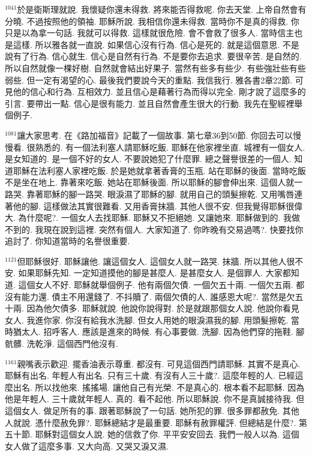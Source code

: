 \documentclass{book}
\begin{document}
$^{1041}$於是衛斯理就說.
我懷疑你還未得救.
將來能否得救呢.
你去天堂.
上帝自然會有分曉.
不過按照他的領袖.
耶穌所說.
我相信你還未得救.
當時你不是真的得救.
你只是以為拿一句話.
我就可以得救.
這樣就很危險.
會不會救了很多人.
當時信主也是這樣.
所以雅各就一直說.
如果信心沒有行為.
信心是死的.
就是這個意思.
不是說有了行為.
信心就生.
信心是自然有行為.
不是要你去追求.
要很辛苦.
是自然的.
所以自然就像一棵好樹.
自然就會結出好果子.
當然有些多有些少.
有些強壯些有些弱些.
但一定有渴望的心.
最後我們要說今天的重點.
我信我行.
雅各書2章22節.
可見他的信心和行為.
互相效力.
並且信心是藉著行為而得以完全.
剛才說了這麼多的引言.
要帶出一點.
信心是很有能力.
並且自然會產生很大的行動.
我先在聖經裡舉個例子.

$^{1081}$讓大家思考.
在《路加福音》記載了一個故事.
第七章36到50節.
你回去可以慢慢看.
很熟悉的.
有一個法利塞人請耶穌吃飯.
耶穌在他家裡坐直.
城裡有一個女人.
是女知道的.
是一個不好的女人.
不要說她犯了什麼罪.
總之聲譽很差的一個人.
知道耶穌在法利塞人家裡吃飯.
於是她就拿著香膏的玉瓶.
站在耶穌的後面.
當時吃飯不是坐在地上.
靠著來吃飯.
她站在耶穌後面.
所以耶穌的腳會伸出來.
這個人就一路哭.
靠著耶穌的腳一路哭.
眼淚濕了耶穌的腳.
就用自己的頭髮擦乾.
又用嘴唇連著他的腳.
這樣做法其實很難看.
又用香膏抹牆.
其他人很不安.
但我覺得耶穌很偉大.
為什麼呢?.
一個女人去找耶穌.
耶穌又不拒絕她.
又讓她來.
耶穌做到的.
我做不到的.
我現在說到這裡.
突然有個人.
大家知道了.
你昨晚有交易過嗎?.
快要找你追討了.
你知道當時的名譽很重要.

$^{1121}$但耶穌很好.
耶穌讓他.
讓這個女人.
這個女人就一路哭.
抹牆.
所以其他人很不安.
如果耶穌先知.
一定知道摸他的腳是甚麼人.
是甚麼女人.
是個罪人.
大家都知道.
這個女人不好.
耶穌就舉個例子.
他有兩個欠債.
一個欠五十兩.
一個欠五兩.
都沒有能力還.
債主不用還錢了.
不抖贖了.
兩個欠債的人.
誰感恩大呢?.
當然是欠五十兩.
因為他欠債多.
耶穌就說.
他說你說得對.
於是就跟那個女人說.
他說你看見女人.
我進你家.
你沒有給我水洗腳.
但女人用她的眼淚濕我的腳.
用頭髮擦乾.
當時猶太人.
招呼客人.
應該是進來的時候.
有心事要做.
洗腳.
因為他們穿的拖鞋.
腳骯髒.
洗乾淨.
這個西門他沒有.

$^{1161}$親嘴表示歡迎.
擺香油表示尊重.
都沒有.
可見這個西門請耶穌.
其實不是真心.
耶穌有出名.
年輕人有出名.
只有三十歲.
有沒有人三十歲?.
這麼年輕的人.
已經這麼出名.
所以找他來.
搖搖場.
讓他自己有光榮.
不是真心的.
根本看不起耶穌.
因為他是年輕人.
三十歲就年輕人.
真的.
看不起他.
所以耶穌說.
你不是真誠接待我.
但這個女人.
做足所有的事.
跟著耶穌說了一句話.
她所犯的罪.
很多罪都赦免.
其他人就說.
憑什麼赦免罪?.
耶穌總結才是最重要.
耶穌有赦罪權評.
但總結是什麼?.
第五十節.
耶穌對這個女人說.
她的信救了你.
平平安安回去.
我們一般人以為.
這個女人做了這麼多事.
又大向高.
又哭又淚又濕.
\end{document}

